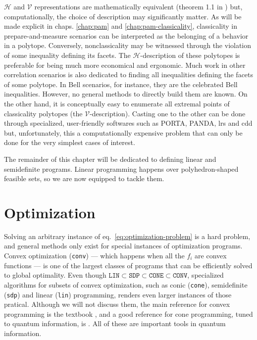 		$\mathcal{H}$ and $\mathcal{V}$ representations are mathematically equivalent (theorem 1.1 in \cite{ziegler}) but, computationally, the choice of description may significantly matter. As will be made explicit in chaps. \ref{chap:pam} and \ref{chap:pam-classicality}, classicality in prepare-and-measure scenarios can be interpreted as the belonging of a behavior in a polytope. Conversely, nonclassicality may be witnessed through the violation of some inequality defining its facets. The $\mathcal{H}$-description of these polytopes is preferable for being much more economical and ergonomic. Much work in other correlation scenarios is also dedicated to finding all inequalities defining the facets of some polytope. In Bell scenarios, for instance, they are the celebrated Bell inequalities. However, no general methods to directly build them are known. On the other hand, it is conceptually easy to enumerate all extremal points of classicality polytopes (the $\mathcal{V}$-description). Casting one to the other can be done through specialized, user-friendly softwares such as PORTA, PANDA, lrs and cdd \cite{} but, unfortunately, this a computationally expensive problem that can only be done for the very simplest cases of interest.

		The remainder of this chapter will be dedicated to defining linear and semidefinite programs. Linear programming happens over polyhedron-shaped feasible sets, so we are now equipped to tackle them.	


	\section{Optimization}

		Solving an arbitrary instance of eq.~\eqref{eq:optimization-problem} is a hard problem, and general methods only exist for special instances of optimization programs. Convex optimization (\texttt{conv}) --- which happens when all the $f_i$ are convex functions --- is one of the largest classes of programs that can be efficiently solved to global optimality. Even though $\texttt{LIN} \subset \texttt{SDP} \subset \texttt{CONE} \subset \texttt{CONV}$, specialized algorithms for subsets of convex optimization, such as conic (\texttt{cone}), semidefinite (\texttt{sdp}) and linear (\texttt{lin}) programming, renders even larger instances of those pratical. Although we will not discuss them, the main reference for convex programming is the textbook \cite{boyd_vanderberghe}, and a good reference for cone programming, tuned to quantum information, is \cite{uola}. All of these are important tools in quantum information.

